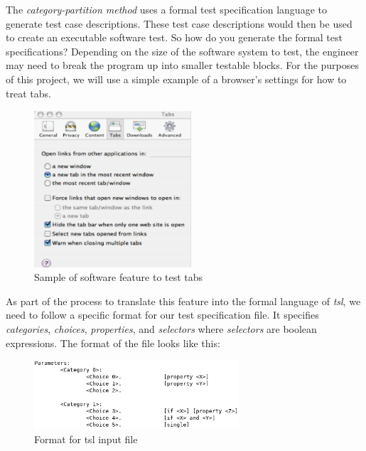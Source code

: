 \documentclass[a4full,12pt]{article}
\begin{document}
The \emph{category-partition method} uses a formal test specification language to generate
  test case descriptions. These test case descriptions would then be used to
  create an executable software test. So how do you generate the formal test 
  specifications? Depending on the size of the software system to test, the 
  engineer may need to break the program up into smaller testable blocks. For 
  the purposes of this project, we will use a simple example of a browser's 
  settings for how to treat tabs.
\begin{figure}[htb]
\centering
\includegraphics[width=2.3in,keepaspectratio]{images/tabs_example.png}
\caption{Sample of software feature to test tabs}
\label{fig:tabs_example}
\end{figure}

As part of the process to translate this feature into the formal language of \emph{tsl},
  we need to follow a specific format for our test specification file. It specifies
  \emph{categories}, \emph{choices}, \emph{properties}, and \emph{selectors} where 
  \emph{selectors} are boolean expressions. The format of the file looks like this:
\begin{figure}[htb]
\centering
\includegraphics[width=3in,keepaspectratio]{images/tsl_format.png}
\caption{Format for tsl input file}
\label{fig:tsl_format}
\end{figure}
\end{document}
